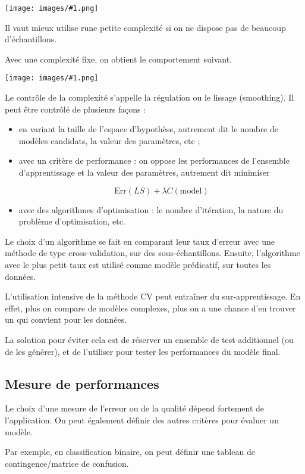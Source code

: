 \documentclass[10pt,a4paper]{report}
\newcommand{\dessin}[1]{\begin{center}\texttt{[image: images/\#1.png]}\end{center}}
\begin{document}
		\dessin{7}
		
		Il vaut mieux utilise rune petite complexité si on ne dispose pas de beaucoup d'échantillons.
		
		Avec une complexité fixe, on obtient le comportement suivant.
		
		\dessin{8}
		
		Le contrôle de la complexité s'appelle la régulation ou le lissage (smoothing). Il peut être contrôlé de plusieurs façons :
		
		\begin{itemize}
			\item en variant la taille de l'espace d'hypothèse, autrement dit le nombre de modèles candidats, la valeur des paramètres, etc ;
			\item avec un critère de performance : on oppose les performances de l'ensemble d'apprentissage et la valeur des paramètres, autrement dit minimiser
			
			$$\text{Err}(LS) + \lambda C(\text{model})$$
			
			\item avec des algorithmes d'optimisation : le nombre d'itération, la nature du problème d'optimisation, etc.
		\end{itemize}
		
		Le choix d'un algorithme se fait en comparant leur taux d'erreur avec une méthode de type cross-validation, sur des sous-échantillons. Ensuite, l'algorithme avec le plus petit taux est utilisé comme modèle prédicatif, sur toutes les données.
		
		L'utilisation intensive de la méthode CV peut entraîner du sur-apprentissage. En effet, plus on compare de modèles complexes, plus on a une chance d'en trouver un qui convient pour les données.
		
		La solution pour éviter cela est de réserver un ensemble de test additionnel (ou de les générer), et de l'utiliser pour tester les performances du modèle final.
		
		\subsection{Mesure de performances}
		
		Le choix d'une mesure de l'erreur ou de la qualité dépend fortement de l'application. On peut également définir des autres critères pour évaluer un modèle.
		
		Par exemple, en classification binaire, on peut définir une tableau de contingence/matrice de confusion.
		
\end{document}
